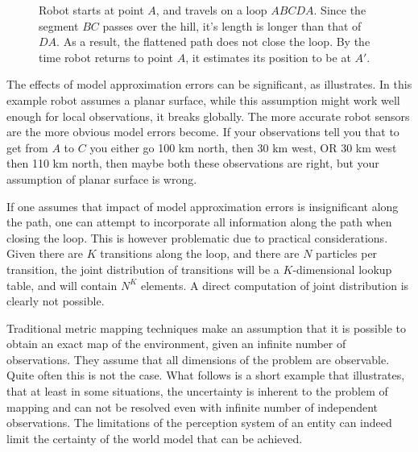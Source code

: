 \begin{figure}[htbp]
  \centering

\caption{Robot starts at point $A$, and travels on a loop
$ABCDA$. Since the segment $BC$ passes over the hill, it's length
is longer than that of $DA$. As a result, the flattened path does not
close the loop. By the time robot returns to point $A$, it
estimates its position to be at $A'$.}
  \label{fig:hump}
\end{figure}


The effects of model approximation errors can be significant, as
 illustrates. In this example robot assumes a
planar surface, while this assumption might work well enough for local
observations, it breaks globally. The more accurate robot sensors are
the more obvious model errors become. If your observations tell you
that to get from $A$ to $C$ you either go 100 km north, then 30 km
west, OR 30 km west then 110 km north, then maybe both these
observations are right, but your assumption of planar surface is
wrong.

If one assumes that impact of model approximation errors is
insignificant along the path, one can attempt to incorporate all
information along the path when closing the loop. This is however
problematic due to practical considerations. Given there are $K$
transitions along the loop, and there are $N$ particles per
transition, the joint distribution of transitions will be a
$K$-dimensional lookup table, and will contain $N^K$ elements. A
direct computation of joint distribution is clearly not possible.

Traditional metric mapping techniques make an assumption that it is
possible to obtain an exact map of the environment, given an infinite
number of observations. They assume that all dimensions of the problem
are observable. Quite often this is not the case. What follows is a
short example that illustrates, that at least in some situations, the
uncertainty is inherent to the problem of mapping and can not be
resolved even with infinite number of independent observations. The
limitations of the perception system of an entity can indeed limit the
certainty of the world model that can be achieved.



